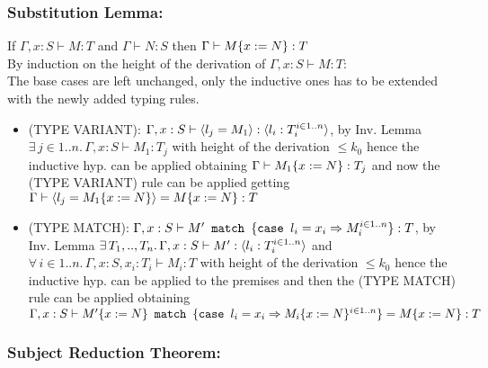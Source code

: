 \subsubsection*{Substitution Lemma:}

If $\Gamma, x: S \vdash M: T$ and $\Gamma \vdash N: S$ then $\Gamma \vdash M\{x:=N\}: T$\\
By induction on the height of the derivation of $\Gamma, x: S \vdash M: T$:\\
The base cases are left unchanged, only the inductive ones has to be extended with the newly
added typing rules.
\begin{itemize}
	\item (TYPE VARIANT): $\Gamma, x: S \vdash \langle l_j = M_1 \rangle: \langle l_i: T_i^{i \in 1..n} \rangle$,
	      by Inv. Lemma $\exists\, j \in 1..n.\, \Gamma, x: S \vdash M_1: T_j$ with height of the
	      derivation $\le k_0$ hence the inductive hyp. can be applied obtaining
	      $\Gamma \vdash M_1\{x:=N\}: T_j$ and now the (TYPE VARIANT) rule can be applied
	      getting $\Gamma \vdash \langle l_j = M_1\{x:=N\} \rangle = M\{x:=N\} : T$
	\item (TYPE MATCH): $\Gamma, x: S \vdash M'\texttt{ match }\{\texttt{case }l_i = x_i \Rightarrow M_i^{i \in 1..n}\}: T$,
	      by Inv. Lemma $\exists\, T_1,..,T_n.\, \Gamma, x: S \vdash M': \langle l_i: T_i^{i \in 1..n} \rangle$
	      and $\forall\, i \in 1..n.\, \Gamma, x: S, x_i: T_i \vdash M_i: T$ with height of the
	      derivation $\le k_0$ hence the inductive hyp. can be applied to the premises and then
	      the (TYPE MATCH) rule can be applied obtaining
	      $\Gamma, x: S \vdash M'\{x:=N\}\texttt{ match }\{\texttt{case }l_i = x_i \Rightarrow M_i\{x:=N\}^{i \in 1..n}\} = M\{x:=N\}: T$
\end{itemize}

\subsubsection*{Subject Reduction Theorem:}

